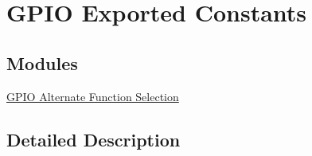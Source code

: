\hypertarget{group___g_p_i_o_ex___exported___constants}{}\section{G\+P\+IO Exported Constants}
\label{group___g_p_i_o_ex___exported___constants}
\subsection*{Modules}
\begin{DoxyCompactItemize}
\item 
\hyperlink{group___g_p_i_o___alternate__function__selection}{G\+P\+I\+O Alternate Function Selection}
\end{DoxyCompactItemize}


\subsection{Detailed Description}
